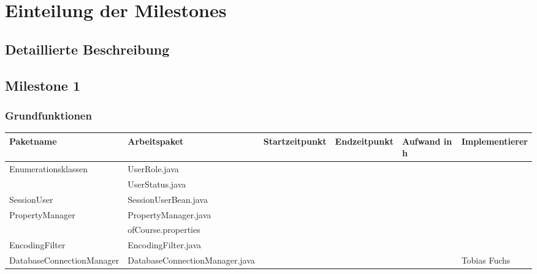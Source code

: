 \documentclass[12pt,a4paper]{scrreprt}
\begin{document}
	\chapter{Einteilung der Milestones}
	\begin{landscape}
	\chapter{Detaillierte Beschreibung}
	\section{Milestone 1}
	
	\subsection{Grundfunktionen}
	\begin{tabular}{|p{6cm} |p{6cm}|p{3cm}|p{3cm}|p{2cm}|p{3cm}|}
		\hline \textbf{Paketname} & \textbf{Arbeitspaket} & \textbf{Startzeitpunkt} & \textbf{Endzeitpunkt} & \textbf{Aufwand in h} & \textbf{Implementierer} \\ 
		\hline  Enumerationsklassen  &       UserRole.java                        &                            &                             &                     &\\ 
			                         &       UserStatus.java                      &                            &                             &                     &\\ 
		\hline  SessionUser          &   SessionUserBean.java                     &                            &                             &                     &\\ 
		\hline  PropertyManager      &   PropertyManager.java                     &                            &                             &                     &\\ 
	                               	 &   ofCourse.properties                      &                            &                             &                     &\\
	    \hline  EncodingFilter       &   EncodingFilter.java                      &                            &                             &                     &\\ 
	    \hline  DatabaseConnectionManager       &  DatabaseConnectionManager.java                      &                            &                             &              & Tobias Fuchs\\   

\end{tabular}
\end{landscape}
\end{document}
